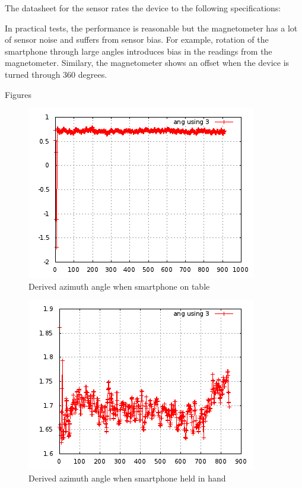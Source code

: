 The datasheet for the sensor rates the device to the following specifications:

In practical tests, the performance is reasonable but the magnetometer has a 
lot of sensor noise and suffers from sensor bias. For example, rotation of 
the smartphone through large angles introduces bias in the readings from the 
magnetometer. Similary, the magnetometer shows an offset when the device is 
turned through 360 degrees.

Figures 

\begin{figure}\centering
    \includegraphics{figures/angle_stationary_table.png}
    \caption{Derived azimuth angle when smartphone on table}
\end{figure}

\begin{figure}\centering
    \includegraphics{figures/angle_handheld_standing.png}
    \caption{Derived azimuth angle when smartphone held in hand}
\end{figure}



